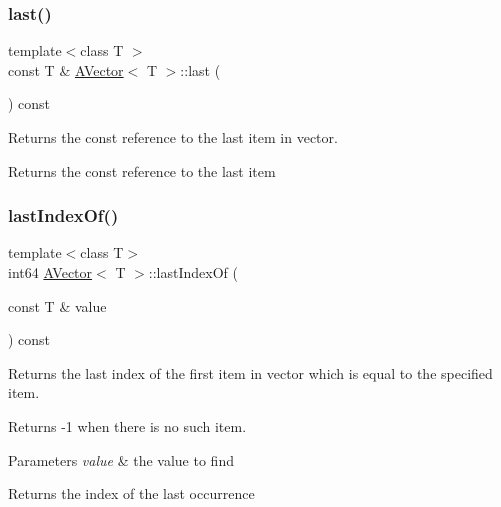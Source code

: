 \subsubsection{\texorpdfstring{last()}{last()}\hspace{0.1cm}{\footnotesize\ttfamily [2/2]}}
{\footnotesize\ttfamily template$<$class T $>$ \\
const T \& \mbox{\hyperlink{class_a_vector}{A\+Vector}}$<$ T $>$\+::last (\begin{DoxyParamCaption}{ }\end{DoxyParamCaption}) const}



Returns the const reference to the last item in vector. 

\begin{DoxyReturn}{Returns}
the const reference to the last item 
\end{DoxyReturn}
\mbox{\label{class_a_vector_a0136c965390cde0c87fdf65c5ee63b9f}} 
\subsubsection{\texorpdfstring{lastIndexOf()}{lastIndexOf()}}
{\footnotesize\ttfamily template$<$class T$>$ \\
int64 \mbox{\hyperlink{class_a_vector}{A\+Vector}}$<$ T $>$\+::last\+Index\+Of (\begin{DoxyParamCaption}\item[{const T \&}]{value }\end{DoxyParamCaption}) const}



Returns the last index of the first item in vector which is equal to the specified item. 

Returns -\/1 when there is no such item.


\begin{DoxyParams}{Parameters}
{\em value} & the value to find \\
\hline
\end{DoxyParams}
\begin{DoxyReturn}{Returns}
the index of the last occurrence 
\end{DoxyReturn}
\mbox{\label{class_a_vector_a6edc7065ff507e44537fd6e9053f98bf}} 

